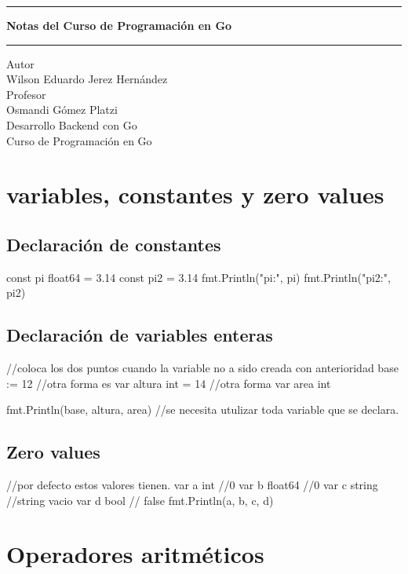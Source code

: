\documentclass{article}
\begin{document}
\pagestyle{empty}
\begin{center}
\begin{figure}[h]
\centering


\end{figure}
\Large
\hrule
\vspace{4mm}
\textbf{Notas del Curso de Programación en Go}\\

\vspace{4mm}
\hrule
\large
\vfill
Autor\\

Wilson Eduardo Jerez Hernández \\
\vfill
Profesor\\

Osmandi Gómez
\vfill
Platzi\\
Desarrollo Backend con Go\\
Curso de Programación en Go\\
\end{center}
\newpage


\tableofcontents
\newpage

\section{variables, constantes y zero values}
\subsection{Declaración de constantes} 
const pi float64 = 3.14
const pi2 = 3.14
fmt.Println("pi:", pi)
fmt.Println("pi2:", pi2)
\subsection{Declaración de variables enteras} 
//coloca los dos puntos cuando la variable no a sido creada con anterioridad
base := 12
//otra forma es
var altura int = 14
//otra forma
var area int

fmt.Println(base, altura, area) //se necesita utulizar toda variable que se declara.
\subsection{Zero values} 
//por defecto estos valores tienen.
var a int     //0
var b float64 //0
var c string  //string vacio
var d bool    // false
fmt.Println(a, b, c, d)
\section{Operadores aritméticos}
\end{document}

